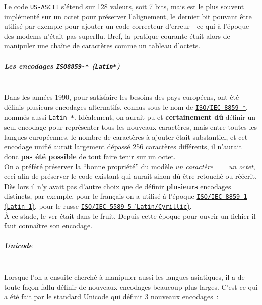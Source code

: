 Le code \texttt{US-ASCII} s'étend sur 128 valeurs, soit 7 bits, mais est
le plus souvent implémenté sur un octet pour préserver l'alignement, le
dernier bit pouvant être utilisé par exemple pour ajouter un code
correcteur d'erreur - ce qui à l'époque des modems n'était pas superflu.
Bref, la pratique courante était alors de manipuler une chaîne de
caractères comme un tableau d'octets.

    \hypertarget{les-encodages-iso8859--latin}{%
\subparagraph{\texorpdfstring{Les encodages \texttt{ISO8859-*}
(\texttt{Latin*})}{Les encodages ISO8859-* (Latin*)}\\\\}\label{les-encodages-iso8859--latin}}

    Dans les années 1990, pour satisfaire les besoins des pays européens,
ont été définis plusieurs encodages alternatifs, connus sous le nom de
\href{http://en.wikipedia.org/wiki/ISO/IEC_8859}{\texttt{ISO/IEC\ 8859-*}},
nommés aussi \texttt{Latin-*}. Idéalement, on aurait pu et
\textbf{certainement dû} définir un seul encodage pour représenter tous
les nouveaux caractères, mais entre toutes les langues européennes, le
nombre de caractères à ajouter était substantiel, et cet encodage unifié
aurait largement dépassé 256 caractères différents, il n'aurait donc
\textbf{pas été possible} de tout faire tenir sur un octet.\\

On a préféré préserver la ``bonne propriété'' du modèle \emph{un
caractère} == \emph{un octet}, ceci afin de préserver le code existant
qui aurait sinon dû être retouché ou réécrit.\\

Dès lors il n'y avait pas d'autre choix que de définir
\textbf{plusieurs} encodages distincts, par exemple, pour le français on
a utilisé à l'époque
\href{http://en.wikipedia.org/wiki/ISO/IEC_8859-1}{\texttt{ISO/IEC\ 8859-1}
(\texttt{Latin-1})}, pour le russe
\href{http://en.wikipedia.org/wiki/ISO/IEC_8859-5}{\texttt{ISO/IEC\ 5589-5}
(\texttt{Latin/Cyrillic})}.\\

À ce stade, le ver était dans le fruit. Depuis cette époque pour ouvrir
un fichier il faut connaître son encodage.

    \hypertarget{unicode}{%
\subparagraph{Unicode\\\\}\label{unicode}}

    Lorsque l'on a ensuite cherché à manipuler aussi les langues asiatiques,
il a de toute façon fallu définir de nouveaux encodages beaucoup plus
larges. C'est ce qui a été fait par le standard
\href{http://en.wikipedia.org/wiki/Unicode}{Unicode} qui définit 3
nouveaux encodages~:

